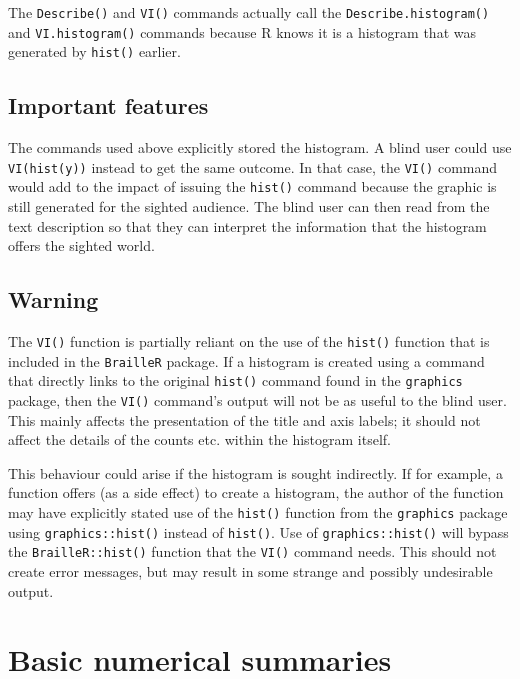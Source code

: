 \documentclass[
]{book}
\begin{document}
The \texttt{Describe()} and \texttt{VI()} commands actually call the \texttt{Describe.histogram()} and \texttt{VI.histogram()} commands because R knows it is a histogram that was generated by \texttt{hist()} earlier.

\hypertarget{important-features}{%
\subsection{Important features}\label{important-features}}

The commands used above explicitly stored the histogram. A blind user could use \texttt{VI(hist(y))} instead to get the same outcome. In that case,
the \texttt{VI()} command would add to the impact of issuing the \texttt{hist()} command because the graphic is still generated for the sighted audience.
The blind user can then read from the text description so that they can interpret the information that the histogram offers the sighted world.

\hypertarget{warning}{%
\subsection{Warning}\label{warning}}

The \texttt{VI()} function is partially reliant on the use of the \texttt{hist()} function that is included in the \texttt{BrailleR} package. If a histogram is created using a command that directly links to the original \texttt{hist()} command found in the \texttt{graphics} package, then the \texttt{VI()} command's output will not be as useful to the blind user. This mainly affects the presentation of the title and axis labels; it should not affect the details of the counts etc. within the histogram itself.

This behaviour could arise if the histogram is sought indirectly. If for example, a function offers (as a side effect) to create a histogram, the author of the function may have explicitly stated use of the \texttt{hist()} function from the \texttt{graphics} package using \texttt{graphics::hist()} instead of \texttt{hist()}. Use of \texttt{graphics::hist()} will bypass the \texttt{BrailleR::hist()} function that the \texttt{VI()} command needs. This should not create error messages, but may result in some strange and possibly undesirable output.

\hypertarget{basic-numerical-summaries}{%
\section{Basic numerical summaries}\label{basic-numerical-summaries}}
\end{document}
